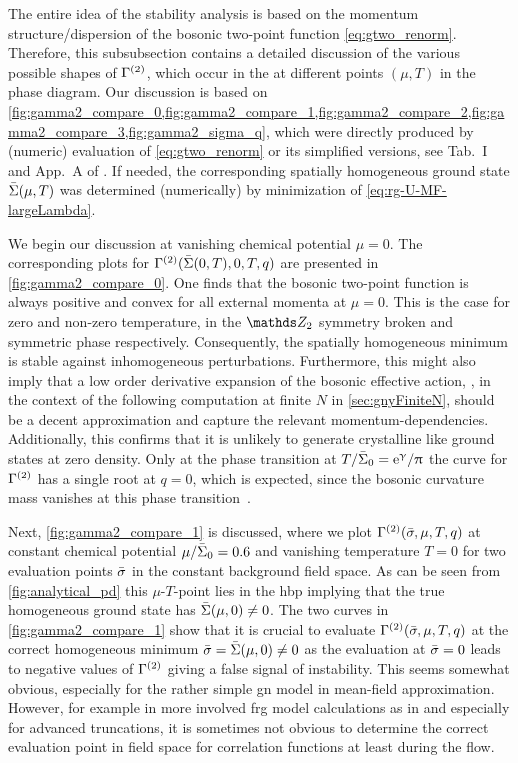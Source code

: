 The entire idea of the stability analysis is based on the momentum structure/dispersion of the bosonic two-point function \eqref{eq:gtwo_renorm}.
Therefore, this subsubsection contains a detailed discussion of the various possible shapes of $\Gamma^{(2)}$, which occur in the \gnm{} at different points $( \mu, T )$ in the phase diagram.
Our discussion is based on \cref{fig:gamma2_compare_0,fig:gamma2_compare_1,fig:gamma2_compare_2,fig:gamma2_compare_3,fig:gamma2_sigma_q}, which were directly produced by (numeric) evaluation of \cref{eq:gtwo_renorm} or its simplified versions, see Tab.~I and App.~A of .
If needed, the corresponding spatially homogeneous ground state $\bar{\Sigma} ( \mu, T )$ was determined (numerically) by minimization of \cref{eq:rg-U-MF-largeLambda}.\bigskip

We begin our discussion at vanishing chemical potential ${\mu = 0}$.
The corresponding plots for $\Gamma^{(2)} ( \bar{\Sigma} ( 0, T ), 0, T, q)$ are presented in \cref{fig:gamma2_compare_0}.
One finds that the bosonic two-point function is always positive and convex for all external momenta at ${\mu = 0}$.
This is the case for zero and non-zero temperature, in the $\Z_2$ symmetry broken and symmetric phase respectively.
Consequently, the spatially homogeneous minimum is stable against inhomogeneous perturbations.
Furthermore, this might also imply that a low order derivative expansion of the bosonic effective action, \eg{}, in the context of the following computation at finite $N$ in \cref{sec:gnyFiniteN}, should be a decent approximation and capture the relevant momentum-dependencies.
Additionally, this confirms that it is unlikely to generate crystalline like ground states at zero density. 
Only at the phase transition at ${T/\bar{\Sigma}_0 = \mathrm{e}^\upgamma/\uppi}$ the curve for $\Gamma^{(2)}$ has a single root at ${q = 0}$, which is expected, since the bosonic curvature mass vanishes at this phase transition~\cite{Dolan:1973qd,Weinberg:1974hy,Harrington:1974tf,Thies:2003kk}.\bigskip

Next, \cref{fig:gamma2_compare_1} is discussed, where we plot $\Gamma^{(2)} ( \bar{\sigma}, \mu, T, q)$ at constant chemical potential ${\mu/\bar{\Sigma}_0 = 0.6}$ and vanishing temperature ${T = 0}$ for two evaluation points $\bar{\sigma}$ in the constant background field space.
As can be seen from \cref{fig:analytical_pd} this $\mu$-$T$-point lies in the \gls{hbp} implying that the true homogeneous ground state has ${\bar{\Sigma} ( \mu, 0 ) \neq 0}$.
The two curves in \cref{fig:gamma2_compare_1} show that it is crucial to evaluate $\Gamma^{(2)} ( \bar{\sigma}, \mu, T, q)$ at the correct homogeneous minimum ${\bar{\sigma} = \bar{\Sigma} ( \mu, 0 ) \neq 0}$ as the evaluation at ${\bar{\sigma} = 0}$ leads to negative values of $\Gamma^{(2)}$ giving a false signal of instability.
This seems somewhat obvious, especially for the rather simple \gls{gn} model in mean-field approximation.
However, for example in more involved \gls{frg} model calculations as in   and especially for advanced truncations, it is sometimes not obvious to determine the correct evaluation point in field space for correlation functions \dash{} at least during the \rg{} flow.\bigskip

